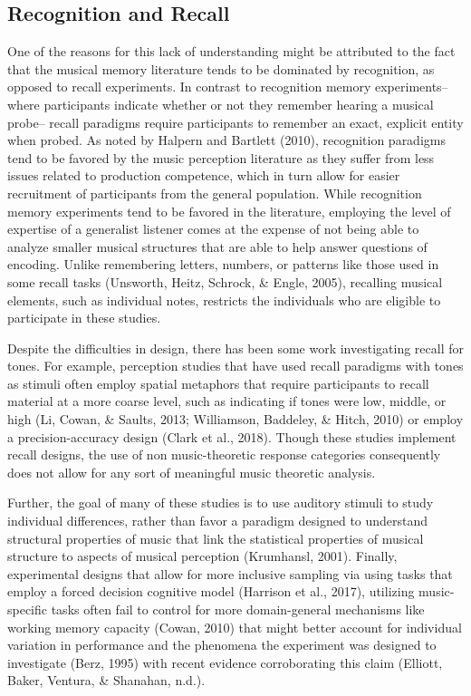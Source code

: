 \documentclass[english,man,floatsintext]{apa6}
\begin{document}
\hypertarget{recognition-and-recall}{%
\subsection{Recognition and Recall}\label{recognition-and-recall}}

One of the reasons for this lack of understanding might be attributed to the fact that the musical memory literature tends to be dominated by recognition, as opposed to recall experiments.
In contrast to recognition memory experiments-- where participants indicate whether or not they remember hearing a musical probe-- recall paradigms require participants to remember an exact, explicit entity when probed.
As noted by Halpern and Bartlett (2010), recognition paradigms tend to be favored by the music perception literature as they suffer from less issues related to production competence, which in turn allow for easier recruitment of participants from the general population.
While recognition memory experiments tend to be favored in the literature, employing the level of expertise of a generalist listener comes at the expense of not being able to analyze smaller musical structures that are able to help answer questions of encoding.
Unlike remembering letters, numbers, or patterns like those used in some recall tasks (Unsworth, Heitz, Schrock, \& Engle, 2005), recalling musical elements, such as individual notes, restricts the individuals who are eligible to participate in these studies.

Despite the difficulties in design, there has been some work investigating recall for tones.
For example, perception studies that have used recall paradigms with tones as stimuli often employ spatial metaphors that require participants to recall material at a more coarse level, such as indicating if tones were low, middle, or high (Li, Cowan, \& Saults, 2013; Williamson, Baddeley, \& Hitch, 2010) or employ a precision-accuracy design (Clark et al., 2018).
Though these studies implement recall designs, the use of non music-theoretic response categories consequently does not allow for any sort of meaningful music theoretic analysis.

Further, the goal of many of these studies is to use auditory stimuli to study individual differences, rather than favor a paradigm designed to understand structural properties of music that link the statistical properties of musical structure to aspects of musical perception (Krumhansl, 2001).
Finally, experimental designs that allow for more inclusive sampling via using tasks that employ a forced decision cognitive model (Harrison et al., 2017), utilizing music-specific tasks often fail to control for more domain-general mechanisms like working memory capacity (Cowan, 2010) that might better account for individual variation in performance and the phenomena the experiment was designed to investigate (Berz, 1995) with recent evidence corroborating this claim (Elliott, Baker, Ventura, \& Shanahan, n.d.).
\end{document}
